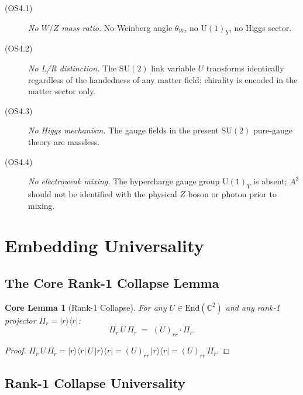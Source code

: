 \documentclass[12pt]{article}
\numberwithin{equation}{section}
\theoremstyle{plain}
\newtheorem*{corelemma}{Core Lemma}   %
\theoremstyle{definition}
\theoremstyle{remark}
\newcommand{\su}{\mathrm{SU}}              %
\newcommand{\uu}{\mathrm{U}}               %
\newcommand{\Cplx}{\mathbb{C}}             %
\newcommand{\Pir}{\Pi_{r}}                 %
\begin{document}
	\begin{description}
		\item[(OS4.1)] \emph{No $W/Z$ mass ratio.}
		No Weinberg angle $\theta_W$, no $\uu(1)_Y$, no Higgs sector.
		
		\item[(OS4.2)] \emph{No L/R distinction.}
		The $\su(2)$ link variable $U$ transforms identically regardless
		of the handedness of any matter field; chirality is encoded in
		the matter sector only.
		
		\item[(OS4.3)] \emph{No Higgs mechanism.}
		The gauge fields in the present $\su(2)$ pure-gauge theory are
		massless.
		
		\item[(OS4.4)] \emph{No electroweak mixing.}
		The hypercharge gauge group $\uu(1)_Y$ is absent; $A^{3}$ should
		not be identified with the physical $Z$ boson or photon prior to
		mixing.
	\end{description}
	
	\section{Embedding Universality}
	\label{sec:embedding-univ}
	
	\subsection{The Core Rank-1 Collapse Lemma}
	\label{sec:core-lemma}
	
	\begin{corelemma}[Rank-1 Collapse]
		For any $U\in\mathrm{End}(\Cplx^{2})$ and any rank-1 projector
		$\Pir = |r\rangle\langle r|$:
		\begin{equation}
			\Pir\, U\,\Pir \;=\; (U)_{rr}\cdot\Pir.
			\label{eq:core-lemma}
		\end{equation}
	\end{corelemma}
	
	\begin{proof}
		$\Pir\, U\,\Pir
		= |r\rangle\langle r|\,U\,|r\rangle\langle r|
		= (U)_{rr}\,|r\rangle\langle r|
		= (U)_{rr}\,\Pir.$
	\end{proof}
	
	\subsection{Rank-1 Collapse Universality}
	\label{sec:rank1-univ}
	
\end{document}
